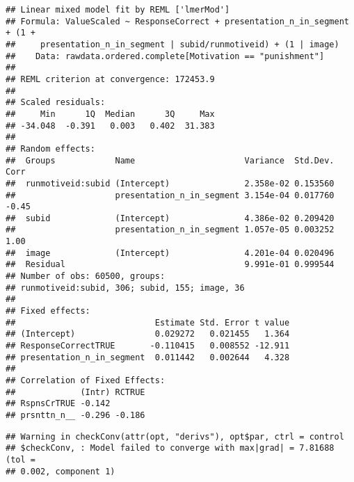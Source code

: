\documentclass[]{article}
\begin{document}
\begin{verbatim}
## Linear mixed model fit by REML ['lmerMod']
## Formula: ValueScaled ~ ResponseCorrect + presentation_n_in_segment + (1 +  
##     presentation_n_in_segment | subid/runmotiveid) + (1 | image)
##    Data: rawdata.ordered.complete[Motivation == "punishment"]
## 
## REML criterion at convergence: 172453.9
## 
## Scaled residuals: 
##     Min      1Q  Median      3Q     Max 
## -34.048  -0.391   0.003   0.402  31.383 
## 
## Random effects:
##  Groups            Name                      Variance  Std.Dev. Corr 
##  runmotiveid:subid (Intercept)               2.358e-02 0.153560      
##                    presentation_n_in_segment 3.154e-04 0.017760 -0.45
##  subid             (Intercept)               4.386e-02 0.209420      
##                    presentation_n_in_segment 1.057e-05 0.003252 1.00 
##  image             (Intercept)               4.201e-04 0.020496      
##  Residual                                    9.991e-01 0.999544      
## Number of obs: 60500, groups:  
## runmotiveid:subid, 306; subid, 155; image, 36
## 
## Fixed effects:
##                            Estimate Std. Error t value
## (Intercept)                0.029272   0.021455   1.364
## ResponseCorrectTRUE       -0.110415   0.008552 -12.911
## presentation_n_in_segment  0.011442   0.002644   4.328
## 
## Correlation of Fixed Effects:
##             (Intr) RCTRUE
## RspnsCrTRUE -0.142       
## prsnttn_n__ -0.296 -0.186
\end{verbatim}

\begin{verbatim}
## Warning in checkConv(attr(opt, "derivs"), opt$par, ctrl = control
## $checkConv, : Model failed to converge with max|grad| = 7.81688 (tol =
## 0.002, component 1)
\end{verbatim}
\end{document}
